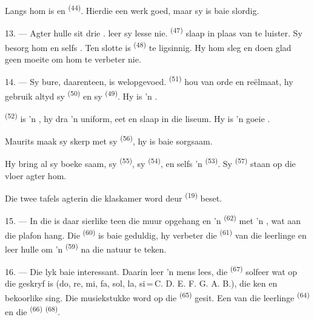 Langs hom is  en  \textsuperscript{(44)}. Hierdie een
werk goed, maar sy  is baie slordig.

13. --- Agter hulle sit drie .  leer sy lesse nie.
 \textsuperscript{(47)} slaap in plaas van te luister. Sy
 besorg hom  en selfs . Ten slotte is
 \textsuperscript{(48)} te ligsinnig. Hy  hom sleg en
doen glad geen moeite om hom te verbeter nie.

14. --- Sy bure, daarenteen, is welopgevoed.  \textsuperscript{(51)} hou
van orde en reëlmaat, hy gebruik altyd sy  \textsuperscript{(50)} en sy
 \textsuperscript{(49)}. Hy is 'n .

 \textsuperscript{(52)} is 'n , hy dra 'n uniform,
eet en slaap in die liseum. Hy is 'n goeie .

Maurits maak sy  skerp met sy 
\textsuperscript{(56)}, hy is baie sorgsaam.

Hy bring al sy boeke saam, sy  \textsuperscript{(55)}, sy
 \textsuperscript{(54)}, en selfs 'n 
\textsuperscript{(53)}. Sy  \textsuperscript{(57)} staan op die vloer
agter hom.

Die twee tafels agterin die klaskamer word deur 
\textsuperscript{(19)} beset.

\VUsaut{4.6mm}
\VUsaut{3.4mm}

15. --- In die  is daar sierlike  teen die muur
opgehang en 'n  \textsuperscript{(62)} met 'n , wat aan die
plafon hang. Die  \textsuperscript{(60)} is baie geduldig, hy
verbeter die  \textsuperscript{(61)} van die leerlinge en leer hulle
om 'n  \textsuperscript{(59)} na die natuur te teken.

16. --- Die  lyk baie interessant. Daarin leer 'n mens
 lees, die  \textsuperscript{(67)} solfeer wat op die
 geskryf is (do, re, mi, fa, sol, la, si\,=\,C. D. E. F. G. A. B.), die
 ken en bekoorlike  sing. Die musiekstukke word op die
 \textsuperscript{(65)} gesit. Een van die leerlinge  \textsuperscript{(64)} en die  \textsuperscript{(66)}
 \textsuperscript{(68)}.

